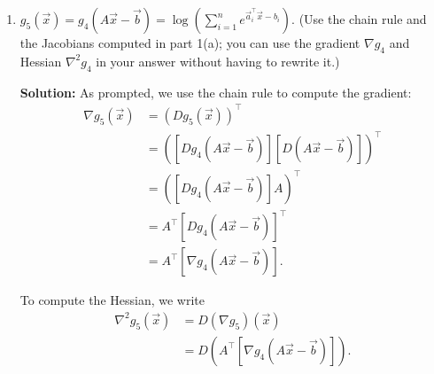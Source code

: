 \documentclass[10pt]{article}
\theoremstyle{definition}
\theoremstyle{plain}
\newcommand{\RR}{\mathbb{R}}
\DeclareMathOperator{\diag}{diag}
\begin{document}
\begin{enumerate}[label=(\alph*)]
\begin{enumerate}[label=\roman*.]
    For the purpose of self-grades, the above solution is fine, but we can also write the Hessian as
    \begin{equation}
    \nabla^2 g_4(\vec{x}) = \diag(\nabla g_4(\vec{x})) - [\nabla g_4(\vec{x})][\nabla g_4(\vec{x})]^\top
    \end{equation}
    where $\diag(\cdot)\colon \RR^n \to \RR^{n \times n}$ forms a diagonal matrix whose diagonal entries are the entries of the input vector, i.e.,
    \begin{equation}
    \diag(\vec{v}) = \begin{bmatrix} v_1 & & \\ & \ddots & \\ & & v_n \end{bmatrix}.
    \end{equation}

    \item $g_5(\vec{x}) = g_4(A\vec{x} - \vec{b}) = \log\!\left(\sum_{i=1}^n e^{\vec{a}_i^\top \vec{x} - b_i}\right)$. (Use the chain rule and the Jacobians computed in part 1(a); you can use the gradient $\nabla g_4$ and Hessian $\nabla^2 g_4$ in your answer without having to rewrite it.)

    \textbf{Solution:} As prompted, we use the chain rule to compute the gradient:
    \begin{align}
    \nabla g_5(\vec{x}) &= (Dg_5(\vec{x}))^\top \\
    &= ([Dg_4(A\vec{x} - \vec{b})][D(A\vec{x} - \vec{b})])^\top \\
    &= ([Dg_4(A\vec{x} - \vec{b})]A)^\top \\
    &= A^\top [Dg_4(A\vec{x} - \vec{b})]^\top \\
    &= A^\top [\nabla g_4(A\vec{x} - \vec{b})].
    \end{align}

    To compute the Hessian, we write
    \begin{align}
    \nabla^2 g_5(\vec{x}) &= D(\nabla g_5)(\vec{x}) \\
    &= D(A^\top[\nabla g_4(A\vec{x} - \vec{b})]).
    \end{align}


\end{enumerate}
\end{enumerate}
\end{document}

